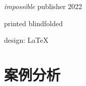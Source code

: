 \documentclass{book}        %
\date{}
\begin{document}
\begin{titlepage}\thispagestyle{empty} \vspace*{3em}
\clearpage\newpage \thispagestyle{empty} \mbox{} \cleardoublepage


\thispagestyle{empty} \vspace*{7em}{\centering\Huge A++ 敏捷开发  \par}

\thispagestyle{empty} \vspace*{\fill} \parbox{.8\textwidth}{\raggedright \scriptsize
\textit{impossible} publisher 2022

printed blindfolded

design: \LaTeX
}
\end{titlepage}
\clearpage \thispagestyle{empty}\cleardoublepage
\newpage %


\tableofcontents %
















\part{案例分析}
\end{document}

